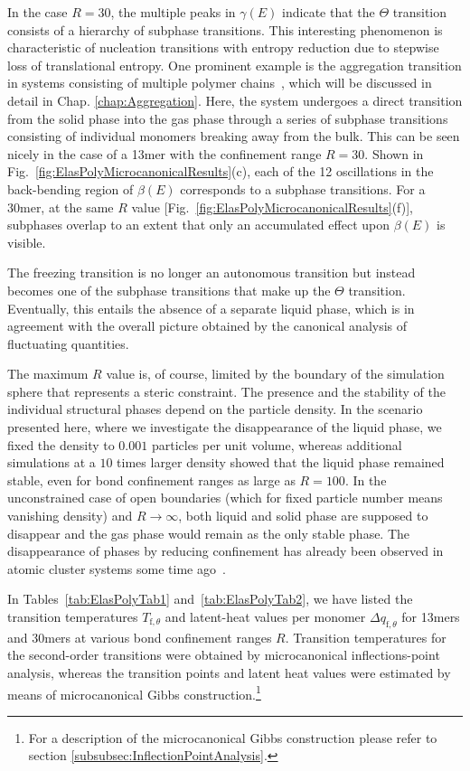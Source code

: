 \documentclass[12pt]{report}
\begin{document}
In the case $R = 30$, the multiple peaks in $\gamma(E)$ indicate that the $\Theta$ transition consists of a hierarchy of subphase transitions. This interesting phenomenon is characteristic of nucleation transitions with entropy reduction due to stepwise loss of translational entropy. One prominent example is the aggregation transition in systems consisting of multiple polymer chains~\cite{Bachmann2014,KociAgg2015,Junghans2008,Junghans2009,Junghans2011},
which will be discussed in detail in Chap.\,\,\ref{chap:Aggregation}. Here, the system undergoes a direct transition from the solid phase into the gas phase through a series of subphase transitions consisting of individual monomers breaking away from the bulk.
\newpage
\noindent
This can be seen nicely in the case of a 13mer with the confinement range $R = 30$. Shown in Fig.~\ref{fig:ElasPolyMicrocanonicalResults}(c), each of the 12 oscillations in the back-bending region of $\beta(E)$ corresponds to a subphase transitions. For a 30mer, at the same $R$ value [Fig.~\ref{fig:ElasPolyMicrocanonicalResults}(f)], subphases overlap to an extent that only an accumulated effect upon $\beta(E)$ is visible. 

The freezing transition is no longer an autonomous transition but instead becomes one of the subphase transitions that make up the $\Theta$ transition. Eventually, this entails the absence of a separate liquid phase, which is in agreement with the overall picture obtained by the canonical analysis of fluctuating quantities.

The maximum $R$ value is, of course, limited by the boundary of the simulation sphere that represents a steric constraint. The presence and the stability of the individual structural phases depend on the particle density. In the scenario presented here, where we investigate the disappearance of the liquid phase, we fixed the density to $0.001$ particles per unit volume, whereas additional simulations at a $10$ times larger density showed that the liquid phase remained stable, even for bond confinement ranges as large as $R=100$. In the unconstrained case of open boundaries (which for fixed particle number means vanishing density) and $R\to\infty$, both liquid and solid phase are supposed to disappear and the gas phase would remain as the only stable phase. The disappearance of phases by reducing confinement has already been observed in atomic cluster systems some time ago~\cite{calvo1,calvo2}.

In Tables~\ref{tab:ElasPolyTab1} and~\ref{tab:ElasPolyTab2}, we have listed the transition temperatures $T_{\mathrm{f},\theta}$ and latent-heat values per monomer $\Delta q_{\mathrm{f},\theta}$ for 13mers and 30mers at various bond confinement ranges $R$. Transition temperatures for the second-order transitions were obtained by microcanonical inflections-point analysis, whereas the transition points and latent heat values were estimated by means of microcanonical Gibbs construction.\footnote{For a description of the microcanonical Gibbs construction please refer to section\,\,\ref{subsubsec:InflectionPointAnalysis}.}
%
\end{document}
